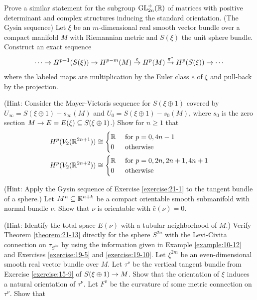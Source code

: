 \begin{enumerate}[label=\theexercise.\arabic*.,ref=\theexercise.\arabic*,leftmargin=2.7em]
    Prove a similar statement for the subgroup ${\mathrm{{GL}}}_{2n}^{ + }( \mathbb{R})$ of matrices with positive determinant and complex structures inducing the standard orientation.
  \newchap[21]
  \NewItem (The Gysin sequence) Let $\xi$ be an $m$-dimensional real smooth vector bundle over a compact manifold $M$ with Riemannian metric and $S( \xi )$ the unit sphere bundle. Construct an exact sequence
    \[
      \cdots  \rightarrow  {H}^{p- 1}( {S( \xi ) })  \rightarrow  {H}^{p- m}( M) \overset{e}{ \rightarrow  }{H}^{p}( M) \overset{{\pi }^*}{ \rightarrow  }{H}^{p}( {S( \xi ) })  \rightarrow  \cdots
    \]
    where the labeled maps are multiplication by the Euler class $e$ of $\xi$ and pull-back by the projection. \par(Hint: Consider the Mayer-Vietoris sequence for $S( {\xi  \oplus  1})$ covered by ${U}_{\infty } = S( {\xi  \oplus  1}) - {s}_{\infty }( M)$ and ${U}_{0} = S( {\xi  \oplus  1}) - {s}_{0}( M)$, where ${s}_{0}$ is the zero section $M \rightarrow  E = E( \xi )  \subseteq  S( {\xi  \oplus  1})$.)
  \NewItem Show for $n \geq  1$ that
    \[
    \begin{aligned}
      {H}^{p}( {{V}_{2}( {\mathbb{R}}^{{2n} + 1}) })  
      & \cong \begin{cases} 
        \mathbb{R} & \text{ for } p = 0,{4n}- 1 \\  
        0     & \text{ otherwise } 
      \end{cases} \\
      {H}^{p}( {{V}_{2}( {\mathbb{R}}^{{2n} + 2}) })  
      & \cong \begin{cases} 
        \mathbb{R} & \text{ for } p = 0,{2n},{2n} + 1,{4n} + 1 \\  
        0     & \text{ otherwise } 
      \end{cases}
    \end{aligned}
    \]
    \par(Hint: Apply the Gysin sequence of Exercise \ref{exercise:21-1} to the tangent bundle of a sphere.)
  \NewItem Let ${M}^{n} \subseteq  {\ensuremath{\mathbb{R}}}^{n + k}$ be a compact orientable smooth submanifold with normal bundle $\nu$. Show that $\nu$ is orientable with $\hat{e}( \nu )  = 0$.
    \par(Hint: Identify the total space $E( \nu )$ with a tubular neighborhood of $M$.)
  \NewItem Verify Theorem \ref{theorem:21-13} directly for the sphere ${S}^{2n}$ with the Levi-Civita connection on ${\tau }_{{S}^{2n}}$ by using the information given in Example \ref{example:10-12} and Exercises \ref{exercise:19-5} and \ref{exercise:19-10}.
    \NewItem Let ${\xi }^{2m}$ be an even-dimensional smooth real vector bundle over $M$. Let ${\tau }^{\nu }$ be the vertical tangent bundle from Exercise \ref{exercise:15-9} of $S( {\xi  \oplus  1})  \rightarrow  M$. Show that the orientation of $\xi$ induces a natural orientation of ${\tau }^{\nu }$. Let ${F}^{ \triangledown  }$ be the curvature of some metric connection on ${\tau }^{\nu }$. Show that

\end{enumerate}
